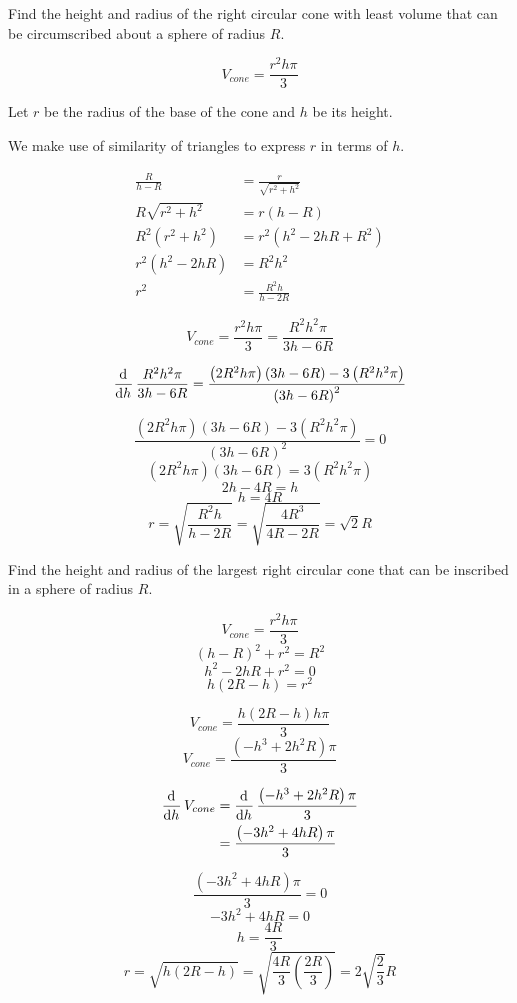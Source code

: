 \documentclass[a4paper, titlepage]{article}
\begin{document}
\begin{Exercise}
Find the height and radius of the right circular cone with
least volume that can be circumscribed about a sphere of
radius \(R\).
\cite{anton-bivens-davis}
\end{Exercise}

\begin{Answer}

\[V_{cone} = \frac{r^2 h \pi}{3}\]

Let \(r\) be the radius of the base of the cone and \(h\) be its height.

We make use of similarity of triangles to express \(r\) in terms of \(h\).

\begin{align*}
  \frac{R}{h - R} &= \frac{r}{\sqrt{r^2 + h^2}} \\
   R \sqrt{r^2 + h^2} &= r\left(h - R\right) \\
   R^2 \left( r^2 + h^2 \right) &= r^2 \left(h^2 - 2 h R + R^2\right) \\
   r^2 \left(h^2 - 2 h R\right) &= R^2 h^2 \\
   r^2 &= \frac{R^2 h}{h - 2 R}
\end{align*}

\[V_{cone} = \frac{r^2 h \pi}{3} = \frac{R^2 h^2 \pi}{3 h - 6 R} \]

\[\dod{}{h} \frac{R^2 h^2 \pi}{3 h - 6 R} =
  \frac{\left(2 R^2 h \pi \right) \left(3 h - 6 R \right) - 3 \left( R^2 h^2 \pi \right)}
       {\left( 3 h - 6 R \right)^2}\]

\[\frac{\left(2 R^2 h \pi \right) \left(3 h - 6 R \right) - 3 \left( R^2 h^2 \pi \right)}
       {\left( 3 h - 6 R \right)^2} = 0\]
\[\left(2 R^2 h \pi \right) \left(3 h - 6 R \right) = 3 \left( R^2 h^2 \pi \right)\]
\[2h - 4R = h\]
\[h = 4R\]
\[r = \sqrt{\frac{R^2 h}{h - 2R}} = \sqrt{\frac{4R^3}{4R - 2R}} = \sqrt{2} R\]
\end{Answer}

\begin{Exercise}
Find the height and radius of the largest right circular cone that can be inscribed in a sphere of radius \(R\).
\end{Exercise}
\begin{Answer}

\[V_{cone} = \frac{r^2 h \pi}{3}\]
\[\left(h - R \right)^2 + r^2 = R^2\]
\[h^2 - 2hR + r^2 = 0\]
\[h \left( 2R - h \right) = r^2\]

\[V_{cone} = \frac{h \left( 2R - h \right) h \pi}{3}\]
\[V_{cone} = \frac{\left( -h^3 + 2h^2R \right) \pi}{3}\]

\begin{align*}
    \dod{}{h} V_{cone} &= \dod{}{h} \frac{\left( -h^3 + 2h^2R \right) \pi}{3} \\
     &= \frac{\left( -3h^2 + 4hR \right) \pi}{3} \\
\end{align*}


\[\frac{\left( -3h^2 + 4hR \right) \pi}{3} = 0\]
\[-3h^2 + 4hR = 0\]
\[h = \frac{4R}{3}\]
\[r = \sqrt{h \left(2R - h\right)}
    = \sqrt{\frac{4R}{3} \left(\frac{2R}{3}\right)}
    = 2 \sqrt{\frac{2}{3}} R\]
\end{Answer}
\end{document}
